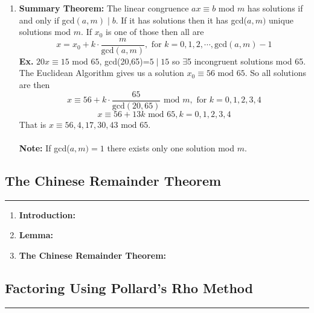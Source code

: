 \documentclass[class=article, crop=false]{standalone}
\begin{document}
\begin{enumerate}[1.]
	\item \textbf{Summary Theorem:} The linear congruence $ax\equiv b\mbox{ mod }m$ has solutions
	if and only if gcd$(a,m)\mid b$. If it has solutions then it has gcd($a,m)$ unique solutions mod $m$.
	If $x_0$ is one of those then all are $$x=x_0 + k\cdot \frac{m}{\mbox{gcd}(a,m)}, \text{ for } k=0,1,2,\cdots, \mbox{gcd}(a,m)-1$$
	\textbf{Ex.} $20x\equiv 15\mbox{ mod }65$, gcd(20,65)=$5\mid 15$ so $\exists$5 incongruent solutions mod 65.
	The Euclidean Algorithm gives us a solution $x_0 \equiv 56\mbox{ mod }65$. So all solutions are then
	$$x\equiv 56 + k\cdot \frac{65}{\mbox{gcd}(20,65)}\mbox{ mod }m, \text{ for } k=0,1,2,3,4$$
	$$x\equiv 56+13k\mbox{ mod }65, k=0,1,2,3,4$$
	That is $x\equiv 56,4,17,30,43 \mbox{ mod }65$.\\\\
	\textbf{Note:} If gcd($a,m)=1$ there exists only one solution mod $m$.
	
\end{enumerate}

\subsection{The Chinese Remainder Theorem}
\rule{\textwidth}{1pt}
\begin{enumerate}[1.]
	\item \textbf{Introduction:}
	
	
	\item \textbf{Lemma:}
	
	\item \textbf{The Chinese Remainder Theorem:}
	
\end{enumerate}

\subsection{Factoring Using Pollard's Rho Method}
\rule{\textwidth}{1pt}

\end{document}
